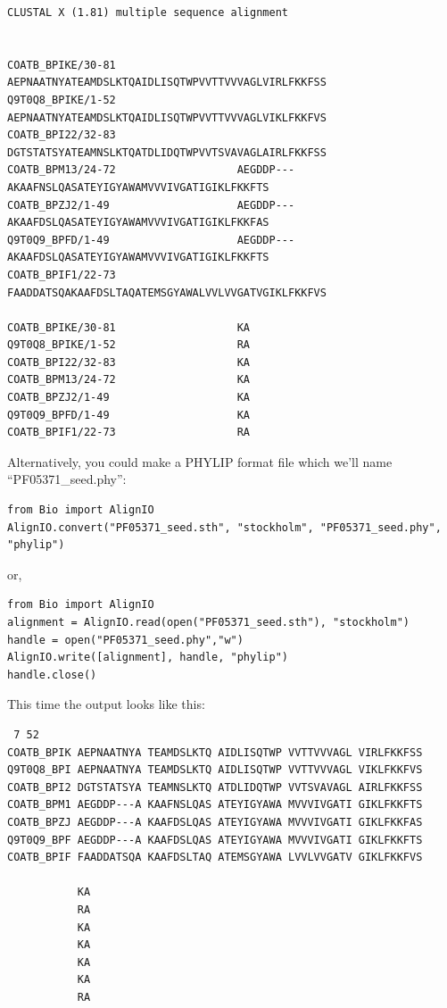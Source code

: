 \documentclass{report}
\begin{document}
\begin{verbatim}
CLUSTAL X (1.81) multiple sequence alignment


COATB_BPIKE/30-81                   AEPNAATNYATEAMDSLKTQAIDLISQTWPVVTTVVVAGLVIRLFKKFSS
Q9T0Q8_BPIKE/1-52                   AEPNAATNYATEAMDSLKTQAIDLISQTWPVVTTVVVAGLVIKLFKKFVS
COATB_BPI22/32-83                   DGTSTATSYATEAMNSLKTQATDLIDQTWPVVTSVAVAGLAIRLFKKFSS
COATB_BPM13/24-72                   AEGDDP---AKAAFNSLQASATEYIGYAWAMVVVIVGATIGIKLFKKFTS
COATB_BPZJ2/1-49                    AEGDDP---AKAAFDSLQASATEYIGYAWAMVVVIVGATIGIKLFKKFAS
Q9T0Q9_BPFD/1-49                    AEGDDP---AKAAFDSLQASATEYIGYAWAMVVVIVGATIGIKLFKKFTS
COATB_BPIF1/22-73                   FAADDATSQAKAAFDSLTAQATEMSGYAWALVVLVVGATVGIKLFKKFVS

COATB_BPIKE/30-81                   KA
Q9T0Q8_BPIKE/1-52                   RA
COATB_BPI22/32-83                   KA
COATB_BPM13/24-72                   KA
COATB_BPZJ2/1-49                    KA
Q9T0Q9_BPFD/1-49                    KA
COATB_BPIF1/22-73                   RA
\end{verbatim}

Alternatively, you could make a PHYLIP format file which we'll name ``PF05371\_seed.phy'':

\begin{verbatim}
from Bio import AlignIO
AlignIO.convert("PF05371_seed.sth", "stockholm", "PF05371_seed.phy", "phylip")
\end{verbatim}

\noindent or,

\begin{verbatim}
from Bio import AlignIO
alignment = AlignIO.read(open("PF05371_seed.sth"), "stockholm")
handle = open("PF05371_seed.phy","w")
AlignIO.write([alignment], handle, "phylip")
handle.close()
\end{verbatim}

This time the output looks like this:

\begin{verbatim}
 7 52
COATB_BPIK AEPNAATNYA TEAMDSLKTQ AIDLISQTWP VVTTVVVAGL VIRLFKKFSS
Q9T0Q8_BPI AEPNAATNYA TEAMDSLKTQ AIDLISQTWP VVTTVVVAGL VIKLFKKFVS
COATB_BPI2 DGTSTATSYA TEAMNSLKTQ ATDLIDQTWP VVTSVAVAGL AIRLFKKFSS
COATB_BPM1 AEGDDP---A KAAFNSLQAS ATEYIGYAWA MVVVIVGATI GIKLFKKFTS
COATB_BPZJ AEGDDP---A KAAFDSLQAS ATEYIGYAWA MVVVIVGATI GIKLFKKFAS
Q9T0Q9_BPF AEGDDP---A KAAFDSLQAS ATEYIGYAWA MVVVIVGATI GIKLFKKFTS
COATB_BPIF FAADDATSQA KAAFDSLTAQ ATEMSGYAWA LVVLVVGATV GIKLFKKFVS

           KA
           RA
           KA
           KA
           KA
           KA
           RA
\end{verbatim}
\end{document}

